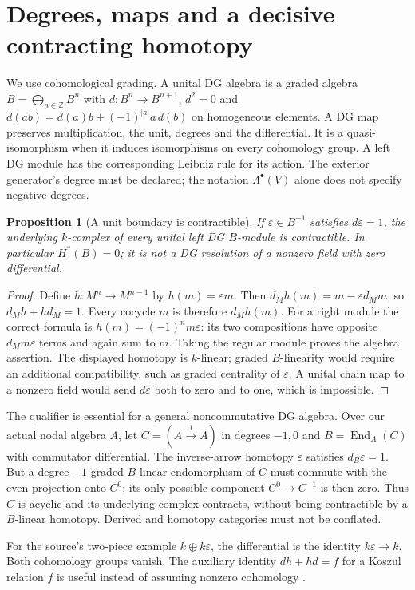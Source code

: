 \documentclass[11pt,oneside,openany]{book}
\newtheorem{proposition}[theorem]{Proposition}
\theoremstyle{definition}\newtheorem{definition}[theorem]{Definition}
\theoremstyle{remark}\newtheorem{remark}[theorem]{Remark}
\begin{document}
\section{Degrees, maps and a decisive contracting homotopy}
We use cohomological grading. A unital DG algebra is a graded algebra
$B=\bigoplus_{n\in\mathbb Z}B^n$ with $d:B^n\to B^{n+1}$,
$d^2=0$ and $d(ab)=d(a)b+(-1)^{|a|}a\,d(b)$ on homogeneous elements.
A DG map preserves multiplication, the unit, degrees and the differential.
It is a quasi-isomorphism when it induces isomorphisms on every cohomology
group. A left DG module has the corresponding Leibniz rule for its action.
The exterior generator's degree must be declared; the notation
$\Lambda^\bullet(V)$ alone does not specify negative degrees.

\begin{proposition}[A unit boundary is contractible]\label{dg:unit}
If $\varepsilon\in B^{-1}$ satisfies $d\varepsilon=1$, the underlying
$k$-complex of every unital left DG $B$-module is contractible. In particular $H^*(B)=0$; it is not a DG
resolution of a nonzero field with zero differential.
\end{proposition}
\begin{proof}
Define $h:M^n\to M^{n-1}$ by $h(m)=\varepsilon m$. Then
$d_Mh(m)=m-\varepsilon d_Mm$, so $d_Mh+hd_M=1$. Every cocycle $m$
is therefore $d_Mh(m)$. For a right module the correct formula is
$h(m)=(-1)^n m\varepsilon$: its two compositions have opposite
$d_Mm\varepsilon$ terms and again sum to $m$. Taking the regular module
proves the algebra assertion. The displayed homotopy is $k$-linear; graded
$B$-linearity would require an additional compatibility, such as graded
centrality of $\varepsilon$. A unital chain map to a nonzero field would
send $d\varepsilon$ both to zero and to one, which is impossible.
\end{proof}
The qualifier is essential for a general noncommutative DG algebra.
Over our actual nodal algebra $A$, let $C=(A\xrightarrow{1}A)$ in degrees
$-1,0$ and $B=\operatorname{End}_A(C)$ with commutator differential.
The inverse-arrow homotopy $\varepsilon$ satisfies $d_B\varepsilon=1$.
But a degree-$-1$ graded $B$-linear endomorphism of $C$ must commute with
the even projection onto $C^0$; its only possible component $C^0\to C^{-1}$
is then zero. Thus $C$ is acyclic and its underlying complex contracts,
without being contractible by a $B$-linear homotopy. Derived and homotopy
categories must not be conflated.

For the source's two-piece example $k\oplus k\varepsilon$, the differential
is the identity $k\varepsilon\to k$. Both cohomology groups vanish.
The auxiliary identity $dh+hd=f$ for a Koszul relation $f$ is useful
instead of assuming nonzero cohomology \cite{StacksKoszulDG}.
\end{document}
